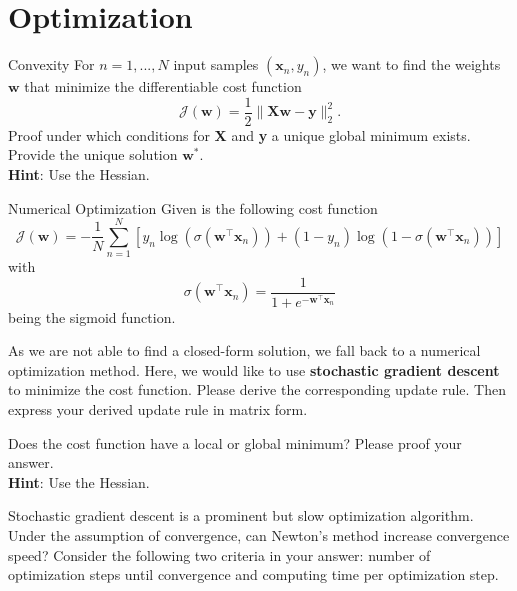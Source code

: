 \documentclass[
	ngerman,
	points=true,%
    solution=true,
    accentcolor=9c,
    colorbacktitle
	]{tudaexercise}
\begin{document}
\section*{Optimization}
\begin{task}{Convexity}
For $ n=1,...,N$ input samples $(\mathbf{x}_n, y_n)$, we want to find the weights $\mathbf{w}$ that minimize the differentiable cost function
\begin{equation*}
    \mathcal{J}(\textbf{w})= \frac{1}{2} \| \textbf{X}\textbf{w}-\mathbf{y} \|_{2}^{2}.
\end{equation*}
Proof under which conditions for \textbf{X} and \textbf{y} a unique global minimum exists. Provide the unique solution $\textbf{w}^{*}$. \\
\textbf{Hint}: Use the Hessian. 

\begin{solution}

\end{solution}
\end{task}
\begin{task}{Numerical Optimization}
Given is the following cost function 
\begin{equation*}
    \mathcal{J}(\textbf{w})=-\frac{1}{N}\sum_{n=1}^{N}[y_{n}\log\left(\sigma(\mathbf{w}^\intercal\mathbf{x}_n)\right)+(1-y_n)\log\left(1-\sigma(\mathbf{w}^\intercal\mathbf{x}_n)\right)]
\end{equation*}
with 
\begin{equation*}
    \sigma(\mathbf{w}^\intercal\mathbf{x}_n)=\frac{1}{1+e^{-\mathbf{w}^\intercal\mathbf{x}_n}}
\end{equation*}
being the sigmoid function.
\begin{subtask}
As we are not able to find a closed-form solution, we fall back to a numerical optimization method. Here, we would like to use \textbf{stochastic gradient descent} to minimize the cost function. Please derive the corresponding update rule. Then express your derived update rule in matrix form.
\end{subtask}
\begin{solution}

\end{solution}

\begin{subtask}
Does the cost function have a local or global minimum? Please proof your answer. \\
\textbf{Hint}: Use the Hessian.
\end{subtask}
\begin{solution}
    
\end{solution}
\begin{subtask}
Stochastic gradient descent is a prominent but slow optimization algorithm. Under the assumption of convergence, can Newton's method increase convergence speed? Consider the following two criteria in your answer: number of optimization steps until convergence and computing time per optimization step. 
\end{subtask}
\begin{solution}

\end{solution}
\end{task}
\end{document}
